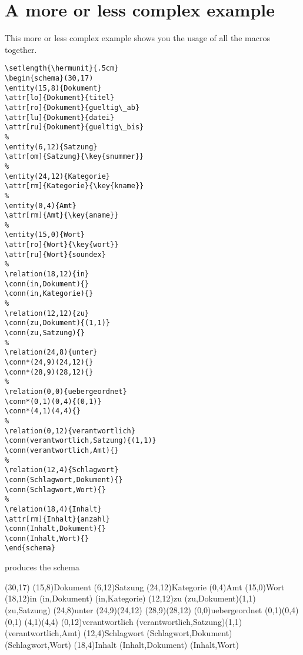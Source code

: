 \documentclass[a4paper,11pt]{article}
\begin{document}
\section{A more or less complex example}

This more or less complex example shows you the usage of all the macros together.

\begin{verbatim}
\setlength{\hermunit}{.5cm}
\begin{schema}(30,17)
\entity(15,8){Dokument}
\attr[lo]{Dokument}{titel}
\attr[ro]{Dokument}{gueltig\_ab}
\attr[lu]{Dokument}{datei}
\attr[ru]{Dokument}{gueltig\_bis}
%
\entity(6,12){Satzung}
\attr[om]{Satzung}{\key{snummer}}
%
\entity(24,12){Kategorie}
\attr[rm]{Kategorie}{\key{kname}}
%
\entity(0,4){Amt}
\attr[rm]{Amt}{\key{aname}}
%
\entity(15,0){Wort}
\attr[ro]{Wort}{\key{wort}}
\attr[ru]{Wort}{soundex}
%
\relation(18,12){in}
\conn(in,Dokument){}
\conn(in,Kategorie){}
%
\relation(12,12){zu}
\conn(zu,Dokument){(1,1)}
\conn(zu,Satzung){}
%
\relation(24,8){unter}
\conn*(24,9)(24,12){}
\conn*(28,9)(28,12){}
%
\relation(0,0){uebergeordnet}
\conn*(0,1)(0,4){(0,1)}
\conn*(4,1)(4,4){}
%
\relation(0,12){verantwortlich}
\conn(verantwortlich,Satzung){(1,1)}
\conn(verantwortlich,Amt){}
%
\relation(12,4){Schlagwort}
\conn(Schlagwort,Dokument){}
\conn(Schlagwort,Wort){}
%
\relation(18,4){Inhalt}
\attr[rm]{Inhalt}{anzahl}
\conn(Inhalt,Dokument){}
\conn(Inhalt,Wort){}
\end{schema}
\end{verbatim}

produces the schema

\setlength{\hermunit}{.5cm}
\begin{schema}(30,17)
\entity(15,8){Dokument}
%
\entity(6,12){Satzung}
%
\entity(24,12){Kategorie}
%
\entity(0,4){Amt}
%
\entity(15,0){Wort}
%
\relation(18,12){in}
\conn(in,Dokument){}
\conn(in,Kategorie){}
%
\relation(12,12){zu}
\conn(zu,Dokument){(1,1)}
\conn(zu,Satzung){}
%
\relation(24,8){unter}
\conn*(24,9)(24,12){}
\conn*(28,9)(28,12){}
%
\relation(0,0){uebergeordnet}
\conn*(0,1)(0,4){(0,1)}
\conn*(4,1)(4,4){}
%
\relation(0,12){verantwortlich}
\conn(verantwortlich,Satzung){(1,1)}
\conn(verantwortlich,Amt){}
%
\relation(12,4){Schlagwort}
\conn(Schlagwort,Dokument){}
\conn(Schlagwort,Wort){}
%
\relation(18,4){Inhalt}
\conn(Inhalt,Dokument){}
\conn(Inhalt,Wort){}
\end{schema}
\end{document}
